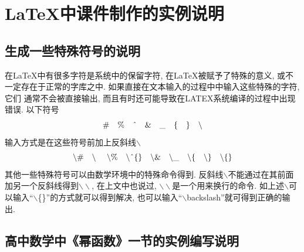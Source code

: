 \section{\LaTeX{}中课件制作的实例说明}
\subsection{生成一些特殊符号的说明}
在\LaTeX{}中有很多字符是系统中的保留字符, 在\LaTeX{}被赋予了特殊的意义, 或不一定存在于正常的字库之中. 如果直接在文本输入的过程中中输入这些特殊的字符, 它们 通常不会被直接输出, 而且有时还可能导致在LATEX系统编译的过程中出现错误. 以下符号
$$\#\quad  \% \quad \text{\^{}} \quad \& \quad\_ \quad \{ \quad\} \quad \backslash$$
输入方式是在这些符号前加上反斜线$\backslash$
$$\backslash\# \quad \backslash\ \quad \backslash\% \quad \backslash\text{\^{}}\{\} \quad \backslash\&\quad\backslash\_ \quad \backslash\{\quad\backslash\}\quad \backslash\{\}$$
其他一些特殊符号可以由数学环境中的特殊命令得到. 反斜线$\backslash$不能通过在其前面加另一个反斜线得到$\backslash\backslash$, 在上文中也说过, $\backslash\backslash$是一个用来换行的命令. 如上述$\backslash$可以输入“$\backslash$\{\}”的方式就可以得到解决, 也可以输入“$\backslash$backslash”就可得到正确的输出.

\subsection{高中数学中《幂函数》一节的实例编写说明}

